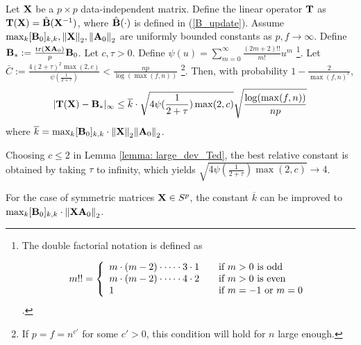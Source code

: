 \begin{lemma} \label{lemma: large_dev_Ted}
	Let ${\mathbf{X}}$ be a $p\times p$ data-independent matrix. Define the linear operator ${\mathbf{T}}$ as ${\mathbf{T}}({\mathbf{X}}) = \hat{{\mathbf{B}}}({\mathbf{X}}^{-1})$, where $\hat{{\mathbf{B}}}(\cdot)$ is defined in (\ref{B_update}). Assume $\max_{k}[{\mathbf{B}}_0]_{k,k}, { \parallel } {\mathbf{X}}{ \parallel }_2, { \parallel } {\mathbf{A}}_0{ \parallel }_2$ are uniformly bounded constants as $p,f\to\infty$. Define ${\mathbf{B}}_*:=\frac{{ \text{tr} }({\mathbf{X}} {\mathbf{A}}_0)}{p} {\mathbf{B}}_0$. Let $c,\tau>0$. Define $\psi(u)=\sum_{m=0}^\infty \frac{(2m+2)!!}{m!} u^m$ \footnote{The double factorial notation is defined as 

\[
m!! = \left\{ 
  \begin{array}{l l}
    m\cdot (m-2) \cdot \cdots \cdot 3 \cdot 1 & \quad \text{if $m>0$ is odd}\\
    m\cdot (m-2) \cdot \cdots \cdot 4 \cdot 2 & \quad \text{if $m>0$ is even}\\
    1 & \quad \text{if $m=-1$ or $m=0$}\\
  \end{array} \right.
\]  
	. }. Let $\bar{C} := \frac{4 (2+\tau)^2 \max(2,c) }{\psi(\frac{1}{2+\tau})}<\frac{np}{\log(\max(f,n))}$ \footnote{If $p=f=n^{c'}$ for some $c'>0$, this condition will hold for $n$ large enough.}. Then, with probability $1-\frac{2}{\max(f,n)^c}$,
	\begin{equation*}
		|{\mathbf{T}}({\mathbf{X}})-{\mathbf{B}}_*|_\infty \leq \overline{k} \cdot \sqrt{4 \psi(\frac{1}{2+\tau}) \max(2,c)} \sqrt{\frac{\log(\max(f,n))}{np}}
	\end{equation*}
	where $\overline{k}=\max_{k}[{\mathbf{B}}_0]_{k,k} \cdot { \parallel } {\mathbf{X}}{ \parallel }_2 { \parallel } {\mathbf{A}}_0{ \parallel }_2$.
\end{lemma}

\begin{remark}
	Choosing $c\leq 2$ in Lemma \ref{lemma: large_dev_Ted}, the best relative constant is obtained by taking $\tau$ to infinity, which yields $\sqrt{4 \psi(\frac{1}{2+\tau}) \max(2,c)} \to 4$.
\end{remark}
\begin{remark}
	For the case of symmetric matrices ${\mathbf{X}}\in S^p$, the constant $\overline{k}$ can be improved to $\max_{k}[{\mathbf{B}}_0]_{k,k} \cdot { \parallel } {\mathbf{X}} {\mathbf{A}}_0{ \parallel }_2$.
\end{remark}


